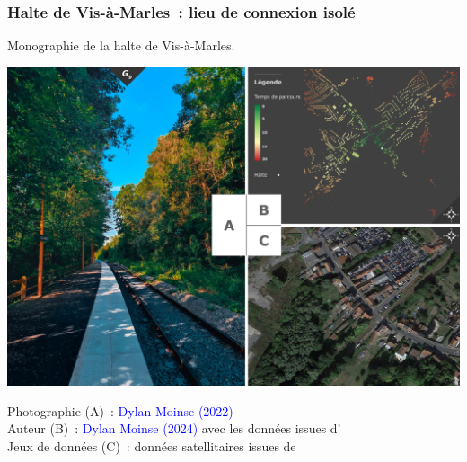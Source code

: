\begin{refsegment}
\subsubsection*{Halte de Vis-à-Marles~: lieu de connexion isolé
    \label{chap3:application-observation-quantitative-vis-a-marles}
    }

        \begin{carte}[h!]\vspace*{4pt}
        \caption{Monographie de la halte de Vis-à-Marles.}
        \label{fig-chap3:monographie-vis-a-marles}
        \centerline{\includegraphics[height=.35\pageheight]{src/Figures/Chap-3/FR_Gare_VisaMarles.jpg}}
        \vspace{5pt}
        \begin{flushright}\scriptsize{
        Photographie (A)~: \textcolor{blue}{Dylan Moinse (2022)}
        \\
        Auteur (B)~: \textcolor{blue}{Dylan Moinse (2024)} avec les données issues d'\textcolor{blue}{\textcite{openstreetmap_openstreetmap_2023}}
        \\
      Jeux de données (C)~: données satellitaires issues de \textcolor{blue}{\textcite{google_earth_google_2023}}
      }\end{flushright}
      \end{carte}


\end{refsegment}
